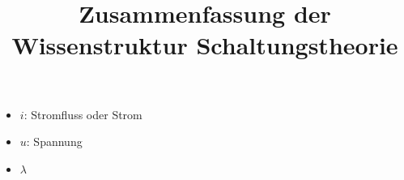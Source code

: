 \documentclass{article}
\title{Zusammenfassung der Wissenstruktur Schaltungstheorie}
\begin{document}
\begin{itemize}
    \item \textbf{$i$}: Stromfluss oder Strom
    \item \textbf{$u$}: Spannung
    \item \textbf{$\lambda$}
\end{itemize}
   
    
\end{document}
